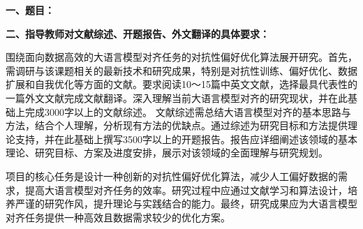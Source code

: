 {
    \setlength{\parindent}{0em}
    \par {\bfseries 一、题目：\Title}
    \\
    \par {\bfseries 二、指导教师对文献综述、开题报告、外文翻译的具体要求：}
}

围绕面向数据高效的大语言模型对齐任务的对抗性偏好优化算法展开研究。首先，需调研与该课题相关的最新技术和研究成果，特别是对抗性训练、偏好优化、数据扩展和自我优化等方面的文献。要求阅读10～15篇中英文文献，选择最具代表性的一篇外文文献完成文献翻译。深入理解当前大语言模型对齐的研究现状，并在此基础上完成3000字以上的文献综述。
文献综述需总结大语言模型对齐的基本思路与方法，结合个人理解，分析现有方法的优缺点。通过综述为研究目标和方法提供理论支持，并在此基础上撰写3500字以上的开题报告。报告应详细阐述该领域的基本理论、研究目标、方案及进度安排，展示对该领域的全面理解与研究规划。

项目的核心任务是设计一种创新的对抗性偏好优化算法，减少人工偏好数据的需求，提高大语言模型对齐任务的效率。研究过程中应通过文献学习和算法设计，培养严谨的研究作风，提升理论与实践结合的能力。最终，研究成果应为大语言模型对齐任务提供一种高效且数据需求较少的优化方案。

\mbox{} \vfill

\signature{指导教师（签名）}
